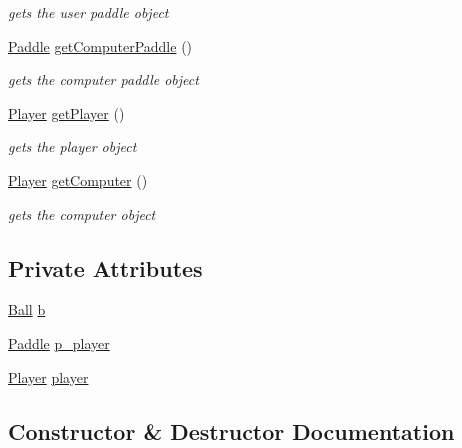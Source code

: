 \begin{DoxyCompactItemize}
\begin{DoxyCompactList}\small\item\em gets the user paddle object \end{DoxyCompactList}\item 
\hyperlink{classmodel_1_1_paddle}{Paddle} \hyperlink{classmodel_1_1_game_model_a15542a275095daae439adcb8b5782055}{get\+Computer\+Paddle} ()
\begin{DoxyCompactList}\small\item\em gets the computer paddle object \end{DoxyCompactList}\item 
\hyperlink{classmodel_1_1_player}{Player} \hyperlink{classmodel_1_1_game_model_a67c62132a9e3578c642613d54350ca75}{get\+Player} ()
\begin{DoxyCompactList}\small\item\em gets the player object \end{DoxyCompactList}\item 
\hyperlink{classmodel_1_1_player}{Player} \hyperlink{classmodel_1_1_game_model_a0bcf575adf7119282fe0a45e3f6bb5df}{get\+Computer} ()
\begin{DoxyCompactList}\small\item\em gets the computer object \end{DoxyCompactList}\end{DoxyCompactItemize}
\subsection*{Private Attributes}
\begin{DoxyCompactItemize}
\item 
\hyperlink{classmodel_1_1_ball}{Ball} \hyperlink{classmodel_1_1_game_model_a1b56c649031a3fb9c0b2930edf719de3}{b}
\item 
\hyperlink{classmodel_1_1_paddle}{Paddle} \hyperlink{classmodel_1_1_game_model_a46b846cead279b52545bb014f946fe47}{p\+\_\+player}
\item 
\hyperlink{classmodel_1_1_player}{Player} \hyperlink{classmodel_1_1_game_model_aa7997c685bdb47e1af57ea496f4128c0}{player}
\end{DoxyCompactItemize}


\subsection{Constructor \& Destructor Documentation}
\hypertarget{classmodel_1_1_game_model_a9b1b28ce881943f0f4035cf5fbd3860d}{}\label{classmodel_1_1_game_model_a9b1b28ce881943f0f4035cf5fbd3860d} 
